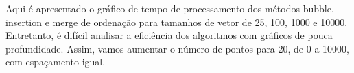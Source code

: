\documentclass[preview]{standalone}
\begin{document}
\begin{center}
Aqui é apresentado o gráfico de tempo de processamento dos métodos bubble, insertion e merge de ordenação para tamanhos de vetor de 25, 100, 1000 e 10000. Entretanto, é difícil analisar a eficiência dos algoritmos com gráficos de pouca profundidade. Assim, vamos aumentar o número de pontos para 20, de 0 a 10000, com espaçamento igual.
\end{center}
\end{document}
